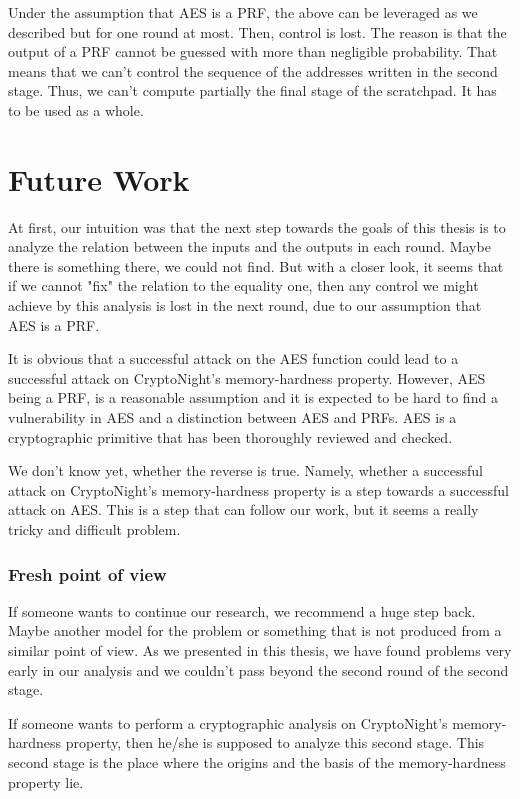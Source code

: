 Under the assumption that AES is a PRF, the above can be leveraged as we described but for one round at most. Then, control is lost. The reason is that the output of a PRF cannot be guessed with more than negligible probability. That means that we can't control the sequence of the addresses written in the second stage. Thus, we can't compute partially the final stage of the scratchpad. It has to be used as a whole.

\section{Future Work}
At first, our intuition was that the next step towards the goals of this thesis is to analyze the relation between the inputs and the outputs in each round. Maybe there is something there, we could not find. But with a closer look, it seems that if we cannot "fix" the relation to the equality one, then any control we might achieve by this analysis is lost in the next round, due to our assumption that AES is a PRF.

It is obvious that a successful attack on the AES function could lead to a successful attack on CryptoNight's memory-hardness property. However, AES being a PRF, is a reasonable assumption and it is expected to be hard to find a vulnerability in AES and a distinction between AES and PRFs. AES is a cryptographic primitive that has been thoroughly reviewed and checked.

We don't know yet, whether the reverse is true. Namely, whether a successful attack on CryptoNight's memory-hardness property is a step towards a successful attack on AES. This is a step that can follow our work, but it seems a really tricky and difficult problem.

\subsubsection{Fresh point of view}
If someone wants to continue our research, we recommend a huge step back. Maybe another model for the problem or something that is not produced from a similar point of view. As we presented in this thesis, we have found problems very early in our analysis and we couldn't pass beyond the second round of the second stage.

If someone wants to perform a cryptographic analysis on CryptoNight's memory-hardness property, then he/she is supposed to analyze this second stage. This second stage is the place where the origins and the basis of the memory-hardness property lie.
\clearpage
\pagebreak

